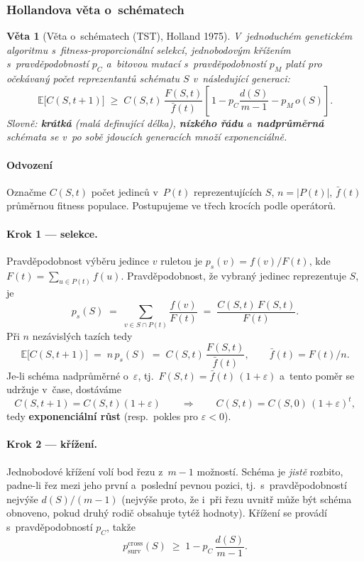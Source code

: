 \documentclass[11pt,a4paper]{article}
\newtheorem{veta}{Věta}[section]
\theoremstyle{definition}
\begin{document}
\subsubsection{Hollandova věta o~schématech}

\begin{veta}[Věta o~schématech (TST), Holland 1975]
V~jednoduchém genetickém algoritmu s~fitness-proporcionální selekcí,
jednobodovým křížením s~pravděpodobností $p_C$ a~bitovou mutací
s~pravděpodobností $p_M$ platí pro očekávaný počet reprezentantů schématu $S$
v~následující generaci:
\[
\mathbb{E}\big[C(S,t+1)\big] \;\ge\; C(S,t)\,\frac{F(S,t)}{\bar f(t)}
\left[\,1 - p_C \frac{d(S)}{m-1} - p_M\, o(S)\right].
\]
Slovně: \textbf{krátká} (malá definující délka), \textbf{nízkého řádu}
a~\textbf{nadprůměrná} schémata se v~po sobě jdoucích generacích množí
exponenciálně.
\end{veta}

\paragraph{Odvození}

Označme $C(S,t)$ počet jedinců v~$P(t)$ reprezentujících $S$, $n = |P(t)|$,
$\bar f(t)$ průměrnou fitness populace. Postupujeme ve třech krocích podle
operátorů.

\paragraph{Krok 1 --- selekce.} Pravděpodobnost výběru jedince $v$ ruletou je
$p_s(v) = f(v)/F(t)$, kde $F(t) = \sum_{u \in P(t)} f(u)$. Pravděpodobnost, že
vybraný jedinec reprezentuje $S$, je
\[
p_s(S) \;=\; \sum_{v \in S \cap P(t)} \frac{f(v)}{F(t)}
\;=\; \frac{C(S,t)\,F(S,t)}{F(t)}.
\]
Při $n$ nezávislých tazích tedy
\[
\mathbb{E}\big[C(S,t+1)\big] \;=\; n\, p_s(S) \;=\; C(S,t)\,\frac{F(S,t)}{\bar f(t)},
\qquad \bar f(t) = F(t)/n .
\]
Je-li schéma nadprůměrné o~$\varepsilon$, tj.\
$F(S,t) = \bar f(t)\,(1+\varepsilon)$ a~tento poměr se udržuje v~čase, dostáváme
\[
C(S,t+1) = C(S,t)(1+\varepsilon)
\qquad\Longrightarrow\qquad
C(S,t) = C(S,0)\,(1+\varepsilon)^{t},
\]
tedy \textbf{exponenciální růst} (resp.\ pokles pro $\varepsilon<0$).

\paragraph{Krok 2 --- křížení.} Jednobodové křížení volí bod řezu z~$m-1$
možností. Schéma je \emph{jistě} rozbito, padne-li řez mezi jeho první
a~poslední pevnou pozici, tj.\ s~pravděpodobností nejvýše $d(S)/(m-1)$
(nejvýše proto, že i~při řezu uvnitř může být schéma obnoveno, pokud druhý
rodič obsahuje tytéž hodnoty). Křížení se provádí s~pravděpodobností $p_C$,
takže
\[
p_{\mathrm{surv}}^{\mathrm{cross}}(S) \;\ge\; 1 - p_C\,\frac{d(S)}{m-1}.
\]
\end{document}
